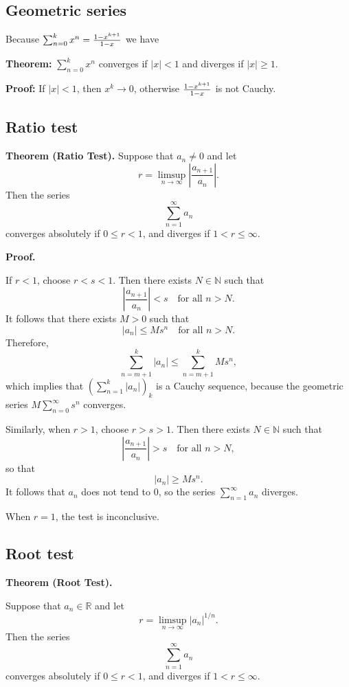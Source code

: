 \documentclass{article}
\begin{document}
\subsection{Geometric series}

Because $\sum_{n=0}^{k}{x^n}={1-x^{k+1}\over 1-x}$ we have

\textbf{Theorem:} $\sum_{n=0}^{k}{x^n}$ converges if $|x|<1$ and diverges if $|x|\geq 1$.

\textbf{Proof:} If $|x|<1$, then $x^k\to 0$, otherwise ${1-x^{k+1}\over 1-x}$ is not Cauchy.

\subsection{Ratio test}


\textbf{Theorem (Ratio Test).}
Suppose that \( a_n \neq 0 \) and let
\[
r = \limsup_{n \to \infty} \left| \frac{a_{n+1}}{a_n} \right|.
\]
Then the series
\[
\sum_{n=1}^{\infty} a_n
\]
converges absolutely if \( 0 \le r < 1 \), and diverges if \( 1 < r \le \infty \).

\textbf{Proof.}

If \( r < 1 \), choose \( r < s < 1 \).  
Then there exists \( N \in \mathbb{N} \) such that
\[
\left| \frac{a_{n+1}}{a_n} \right| < s \quad \text{for all } n > N.
\]
It follows that there exists \( M > 0 \) such that
\[
|a_n| \le M s^n \quad \text{for all } n > N.
\]
Therefore,
\[
\sum_{n=m+1}^{k} |a_n| \le \sum_{n=m+1}^{k} M s^n,
\]
which implies that \( \left( \sum_{n=1}^{k} |a_n| \right)_k \) is a Cauchy sequence,  
because the geometric series \( M \sum_{n=0}^{\infty} s^n \) converges.

Similarly, when \( r > 1 \), choose \( r > s > 1 \).  
Then there exists \( N \in \mathbb{N} \) such that
\[
\left| \frac{a_{n+1}}{a_n} \right| > s \quad \text{for all } n > N,
\]
so that
\[
|a_n| \ge M s^n.
\]
It follows that \( a_n \) does not tend to 0,  
so the series \( \sum_{n=1}^{\infty} a_n \) diverges.

When \( r = 1 \), the test is inconclusive.


\subsection{Root test}

\textbf{Theorem (Root Test).}

Suppose that \( a_n \in \mathbb{R} \) and let
\[
r = \limsup_{n \to \infty} |a_n|^{1/n}.
\]
Then the series
\[
\sum_{n=1}^{\infty} a_n
\]
converges absolutely if \( 0 \le r < 1 \), and diverges if \( 1 < r \le \infty \).
\end{document}

